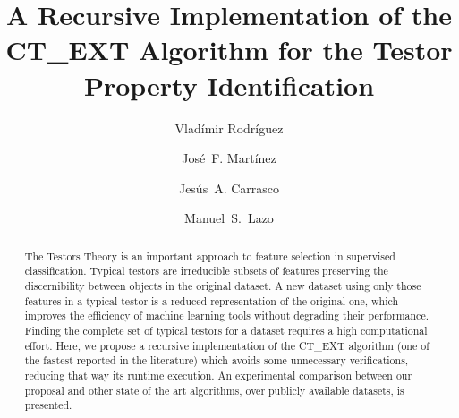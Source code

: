 \documentclass[citeauthoryear]{llncs}
\begin{document}
\mainmatter              %
%
\title{A Recursive Implementation of the CT\_EXT Algorithm 
	   for the Testor Property Identification}
%
			 
\author{Vlad\'{i}mir Rodr\'{i}guez \and Jos\'{e}~F. Mart\'{i}nez
		 \and Jes\'{u}s~A. Carrasco \and Manuel~S.~Lazo}
%
%
%


\maketitle              %

\begin{abstract}
	The Testors Theory is an important approach to feature selection 
	in supervised classification. Typical testors are irreducible subsets 
	of features preserving the discernibility between objects in the 
	original dataset. A new dataset using only those features in a 
	typical testor is a reduced representation of the original one,
	which improves the efficiency of machine learning tools without 
	degrading their performance. Finding the complete set of typical 
	testors for 	a dataset requires a high computational effort. Here, 
	we propose a recursive implementation of the CT\_EXT algorithm 
	(one of the fastest reported in the literature) which avoids some 
	unnecessary verifications, reducing that way its runtime execution. 
	An experimental comparison between our proposal and other state of 
	the art algorithms, over publicly available datasets, is presented.
\end{abstract}
%
\end{document}
